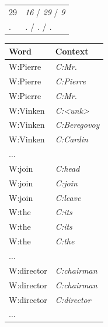\begin{table}[ht]
\begin{tabular}{|ll|}
29 & \textit{16} /  \textit{29} / \textit{9}\\
. & \textit{.}  / \textit{.} / \textit{.}\\
\hline
\end{tabular}
\quad
\begin{tabular}{|ll|}
\hline
\textbf{Word} & \textbf{Context}\\
\hline
W:Pierre & \textit{C:Mr.}\\
W:Pierre & \textit{C:Pierre}\\
W:Pierre & \textit{C:Mr.}\\
W:Vinken & \textit{C:<unk>}\\
W:Vinken & \textit{C:Beregovoy}\\
W:Vinken & \textit{C:Cardin}\\
$\hdots$&\\
W:join & \textit{C:head}\\
W:join & \textit{C:join}\\
W:join & \textit{C:leave}\\
W:the & \textit{C:its}\\
W:the & \textit{C:its}\\
W:the & \textit{C:the}\\
$\hdots$&\\
W:director & \textit{C:chairman}\\
W:director & \textit{C:chairman}\\
W:director & \textit{C:director}\\
$\hdots$&\\
\hline
\end{tabular}
\label{tab:samples}
\end{table}

